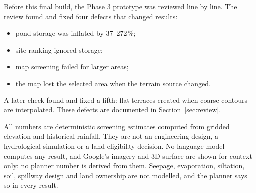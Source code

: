 \documentclass[11pt,a4paper]{article}
\begin{document}
Before this final build, the Phase 3 prototype was reviewed line by line. The review found and fixed four defects that changed results:
\begin{itemize}
\item pond storage was inflated by 37--272\,\%;
\item site ranking ignored storage;
\item map screening failed for larger areas;
\item the map lost the selected area when the terrain source changed.
\end{itemize}
A later check found and fixed a fifth: flat terraces created when coarse contours are interpolated. These defects are documented in Section~\ref{sec:review}.

\begin{warnbox}[title=Honest scope]
All numbers are deterministic screening estimates computed from gridded elevation and historical rainfall. They are not an engineering design, a hydrological simulation or a land-eligibility decision. No language model computes any result, and Google's imagery and 3D surface are shown for context only: no planner number is derived from them. Seepage, evaporation, siltation, soil, spillway design and land ownership are not modelled, and the planner says so in every result.
\end{warnbox}

\clearpage
\end{document}
